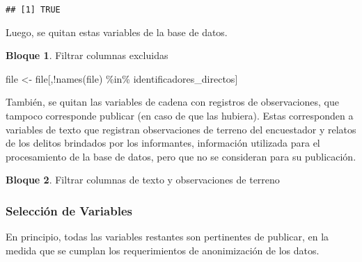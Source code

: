 \documentclass[
]{book}
\newenvironment{Shaded}{\begin{snugshade}}{\end{snugshade}}
\newcommand{\FunctionTok}[1]{\textcolor[rgb]{0.00,0.00,0.00}{#1}}
\newcommand{\NormalTok}[1]{#1}
\newcommand{\OtherTok}[1]{\textcolor[rgb]{0.56,0.35,0.01}{#1}}
\newcommand{\SpecialCharTok}[1]{\textcolor[rgb]{0.00,0.00,0.00}{#1}}
\newcommand{\StringTok}[1]{\textcolor[rgb]{0.31,0.60,0.02}{#1}}
\theoremstyle{definition}
\theoremstyle{definition}
\newtheorem{example}{Bloque}[chapter]
\theoremstyle{definition}
\theoremstyle{definition}
\theoremstyle{remark}
\begin{document}
\begin{verbatim}
## [1] TRUE
\end{verbatim}

Luego, se quitan estas variables de la base de datos.

\begin{example}
\protect\hypertarget{exm:bloque27nbm}{}\label{exm:bloque27nbm}Filtrar columnas excluidas
\end{example}

\begin{Shaded}
\begin{Highlighting}[]
\NormalTok{file }\OtherTok{\textless{}{-}}\NormalTok{ file[,}\SpecialCharTok{!}\FunctionTok{names}\NormalTok{(file) }\SpecialCharTok{\%in\%}\NormalTok{ identificadores\_directos]}
\end{Highlighting}
\end{Shaded}

También, se quitan las variables de cadena con registros de observaciones, que tampoco corresponde publicar (en caso de que las hubiera). Estas corresponden a variables de texto que registran observaciones de terreno del encuestador y relatos de los delitos brindados por los informantes, información utilizada para el procesamiento de la base de datos, pero que no se consideran para su publicación.

\begin{example}
\protect\hypertarget{exm:bloque28nbm}{}\label{exm:bloque28nbm}Filtrar columnas de texto y observaciones de terreno
\end{example}

\begin{Shaded}
\end{Shaded}

\hypertarget{selecciuxf3n-de-variables}{%
\subsubsection{Selección de Variables}\label{selecciuxf3n-de-variables}}

En principio, todas las variables restantes son pertinentes de publicar, en la medida que se cumplan los requerimientos de anonimización de los datos.
\end{document}
